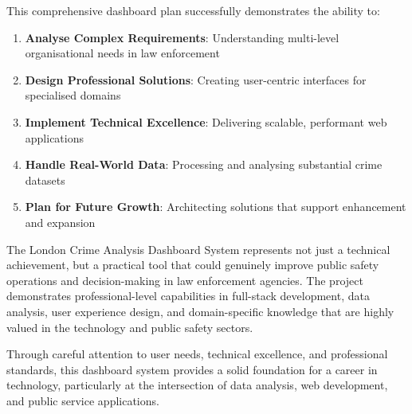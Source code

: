 \documentclass[12pt,a4paper]{article}
\begin{document}
This comprehensive dashboard plan successfully demonstrates the ability to:
\begin{enumerate}
    \item \textbf{Analyse Complex Requirements}: Understanding multi-level organisational needs in law enforcement
    \item \textbf{Design Professional Solutions}: Creating user-centric interfaces for specialised domains
    \item \textbf{Implement Technical Excellence}: Delivering scalable, performant web applications
    \item \textbf{Handle Real-World Data}: Processing and analysing substantial crime datasets
    \item \textbf{Plan for Future Growth}: Architecting solutions that support enhancement and expansion
\end{enumerate}

The London Crime Analysis Dashboard System represents not just a technical achievement, but a practical tool that could genuinely improve public safety operations and decision-making in law enforcement agencies. The project demonstrates professional-level capabilities in full-stack development, data analysis, user experience design, and domain-specific knowledge that are highly valued in the technology and public safety sectors.

Through careful attention to user needs, technical excellence, and professional standards, this dashboard system provides a solid foundation for a career in technology, particularly at the intersection of data analysis, web development, and public service applications.
\end{document}
